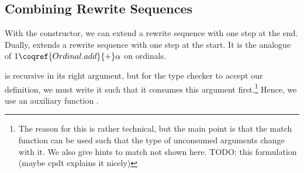 \subsection{Combining Rewrite Sequences}\label{sub:combining}

With the 
constructor, we can extend a rewrite sequence with one step at the
end. Dually,  extends
a rewrite sequence with one step at the start. It is the analogue of
$1 \coqref{Ordinal.add}{+} \alpha$ on ordinals.

 is recursive in its
right argument, but for the \Coq type checker to accept our
definition, we must write it such that it consumes this argument
first.\footnote{The reason for this is rather technical, but the main
  point is that the match function can be used such that the type of
  unconsumed arguments change with it. We also give hints to match not
  shown here. TODO: this formulation (maybe cpdt explains it nicely)}
Hence, we use an auxiliary function
.
